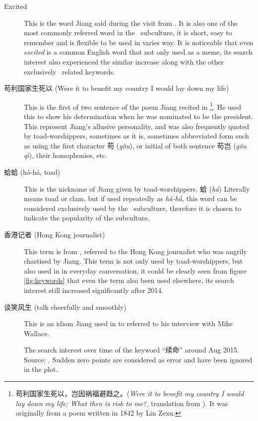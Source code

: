 \begin{description}
	\item[Excited] This is the word Jiang said during the visit from . It is also one of the most commonly referred word in the \moha\ subculture, it is short, easy to remember and is flexible to be used in varies way. It is noticeable that even \textit{excited} is a common English word that not only used as a meme, its search interest also experienced the similar increase along with the other exclusively \moha\ related keywords.
	\item[苟利国家生死以 (Were it to benefit my country I would lay down my life)] This is the first of two sentence of the poem Jiang recited in  \footnote{苟利国家生死以，岂因祸福避趋之。(\textit{Were it to benefit my country I would lay down my life; What then is risk to me?}, translation from \citealp{central_compilation__translation_bureau_2015_2015}). It was originally from a poem written in 1842 by Lin Zexu.}. He used this to show his determination when he was nominated to be the president. This represent Jiang's allusive personality, and was also frequently quoted by toad-worshippers, sometimes as it is, sometimes abbreviated form such as using the first character 苟 (\textit{g\v ou}), or initial of both sentence 苟岂 (\textit{g\v ou q\v{\i}}), their homophonies, etc.
	\item[蛤蛤 (h\'a-h\'a, toad)] This is the nickname of Jiang given by toad-worshippers. 蛤 (\textit{h\'a}) Literally means toad or clam, but if used repeatedly as \textit{h\'a-h\'a}, this word can be considered exclusively used by the \moha\ subculture, therefore it is chosen to indicate the popularity of the subculture.
	\item[香港记者 (Hong Kong journalist)] This term is from , referred to the Hong Kong journalist who was angrily chastised by Jiang. This term is not only used by toad-worshippers, but also used in in everyday conversation, it could be clearly seen from figure \vref{fig:keywords} that even the term also been used elsewhere, its search interest still increased significantly after 2014.
	\item[谈笑风生 (talk cheerfully and smoothly)] This is an idiom Jiang used in  to referred to his interview with Mike Wallace.
	\begin{marginfigure}
		
		\caption[The search interest over time of the keyword ``续命'' around Aug 2015]{The search interest over time of the keyword ``续命'' around Aug 2015. Source: \citet{google_google_????}. Sudden zero points are considered as error and have been ignored in the plot.}

\end{marginfigure}
\end{description}
